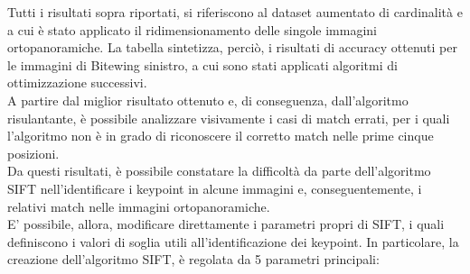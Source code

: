 \documentclass[12pt,a4paper,openright,twoside]{book}
\begin{document}
Tutti i risultati sopra riportati, si riferiscono al dataset aumentato di cardinalità e a cui è stato applicato il ridimensionamento delle singole immagini ortopanoramiche. La tabella sintetizza, perciò, i risultati di accuracy ottenuti per le immagini di Bitewing sinistro, a cui sono stati applicati algoritmi di ottimizzazione successivi.\\
A partire dal miglior risultato ottenuto e, di conseguenza, dall'algoritmo risulantante, è possibile analizzare visivamente i casi di match errati, per i quali l'algoritmo non è in grado di riconoscere il corretto match nelle prime cinque posizioni.\\
Da questi risultati, è possibile constatare la difficoltà da parte dell'algoritmo SIFT nell'identificare i keypoint in alcune immagini e, conseguentemente, i relativi match nelle immagini ortopanoramiche.\\
E' possibile, allora, modificare direttamente i parametri propri di SIFT, i quali definiscono i valori di soglia utili all'identificazione dei keypoint. In particolare, la creazione dell'algoritmo SIFT, è regolata da 5 parametri principali:
\end{document}
